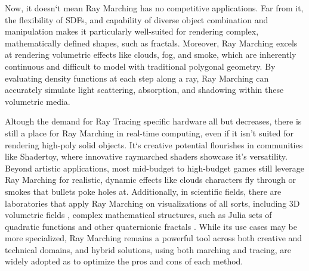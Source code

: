 Now, it doesn`t mean Ray Marching has no competitive applications. Far from it, the flexibility of SDFs, and capability of diverse object combination and manipulation makes it particularly well-suited for rendering complex, mathematically defined shapes, such as fractals. Moreover, Ray Marching excels at rendering volumetric effects like clouds, fog, and smoke, which are inherently continuous and difficult to model with traditional polygonal geometry. By evaluating density functions at each step along a ray, Ray Marching can accurately simulate light scattering, absorption, and shadowing within these volumetric media.

Altough the demand for Ray Tracing specific hardware all but decreases, there is still a place for Ray Marching in real-time computing, even if it isn’t suited for rendering high-poly solid objects. It`s creative potential flourishes in communities like Shadertoy, where innovative raymarched shaders showcase it's versatility. Beyond artistic applications, most mid-budget to high-budget games still leverage Ray Marching for realistic, dynamic effects like clouds characters fly through or smokes that bullets poke holes at. Additionally, in scientific fields, there are laboratories that apply Ray Marching on visualizations of all sorts, including 3D volumetric fields \cite{kettunen2021}, complex mathematical structures, such as Julia sets of quadratic functions and other quaternionic fractals \cite{quilez2001juliasets}. While its use cases may be more specialized, Ray Marching remains a powerful tool across both creative and technical domains, and hybrid solutions, using both marching and tracing, are widely adopted as to optimize the pros and cons of each method.










